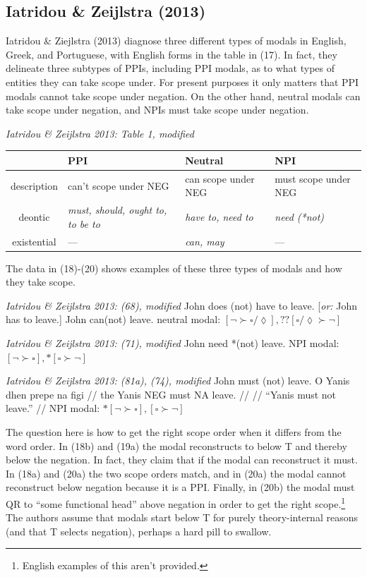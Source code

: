 \documentclass[]{ling-200b-2}
\begin{document}
\subsection{Iatridou \& Zeijlstra (2013)}

Iatridou \& Ziejlstra (2013) diagnose three different types of modals in English, Greek, and Portuguese, with English forms in the table in (17). In fact, they delineate three subtypes of PPIs, including PPI modals, as to what types of entities they can take scope under. For present purposes it only matters that PPI modals cannot take scope under negation. On the other hand, neutral modals can take scope under negation, and NPIs must take scope under negation.

\pex \textit{Iatridou \& Zeijlstra 2013: Table 1, modified}

\small
\begin{tabularx}{0.9\textwidth}{
|c
|>{\centering\arraybackslash}X
|>{\centering\arraybackslash}X
|>{\centering\arraybackslash}X
|
}
\hline
& PPI & Neutral & NPI \\
\hline
\hline
description & can't scope under NEG & can scope under NEG & must scope under NEG \\
\hline
deontic & \textit{must, should, ought to, to be to} & \textit{have to, need to} & \textit{need (*not)} \\
\hline 
existential & --- & \textit{can, may} & --- \\
\hline
\end{tabularx}
\xe

The data in (18)-(20) shows examples of these three types of modals and how they take scope.

\pex \textit{Iatridou \& Zeijlstra 2013: (68), modified}
\a John does (not) have to leave. [\textit{or:} John has to leave.]
\a John can(not) leave.
\a neutral modal: $[\neg \succ \square / \lozenge], ??[\square / \lozenge \succ \neg]$
\xe

\pex \textit{Iatridou \& Zeijlstra 2013: (71), modified}
\a John need *(not) leave.
\a NPI modal: $[\neg \succ \square], *[\square \succ \neg]$
\xe

\pex \textit{Iatridou \& Zeijlstra 2013: (81a), (74), modified}
\a John must (not) leave.
\a 
\begingl
\gla \noindent [Greek] O Yanis dhen prepe na figi //
\glb {} the Yanis NEG must NA leave. //
\glc //
\glft ``Yanis must not leave.'' //
\endgl
\a NPI modal: $*[\neg \succ \square], [\square \succ \neg]$
\xe

The question here is how to get the right scope order when it differs from the word order. In (18b) and (19a) the modal reconstructs to below T and thereby below the negation. In fact, they claim that if the modal can reconstruct it must. In (18a) and (20a) the two scope orders match, and in (20a) the modal cannot reconstruct below negation because it is a PPI. Finally, in (20b) the modal must QR to ``some functional head'' above negation in order to get the right scope.\footnote{ English examples of this aren't provided.} The authors assume that modals start below T for purely theory-internal reasons (and that T selects negation), perhaps a hard pill to swallow.
\end{document}
